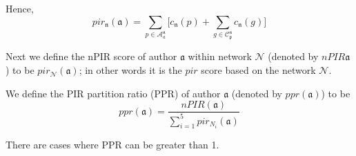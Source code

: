 \documentclass[12pt]{amsart}
\begin{document}
Hence, 
$$ pir_{\mathfrak{n}}(\mathfrak{a}) =  \sum_{p\in \mathcal{A}_a^{\mathfrak{n}} } \big[c_{\mathfrak{{\mathfrak{n}}}}(p) + \sum_{g\in \mathcal{C}_\mathfrak{p}^{\mathfrak{n}}}  c_{\mathfrak{{\mathfrak{n}}}}(g)\big] $$

Next we define the nPIR score  of author $\mathfrak{a}$ within network $\mathcal{N}$ (denoted by $nPIR\mathfrak{a}$) to  be  $pir_{\mathcal{N}}(\mathfrak{a})$; in other words
it is the $pir$ score based on the network $\mathcal{N}$.  



We define the PIR partition ratio (PPR)  of author $\mathfrak{a}$ (denoted by $ppr(\mathfrak{a})$)
to be 
$$ppr(\mathfrak{a})= \dfrac{ nPIR({\mathfrak{a}})} {\sum_{i=1}^{5} pir_{N_i}(\mathfrak{a})} $$

There are cases where PPR can be greater than 1.

\vspace{.1in}
\end{document}
